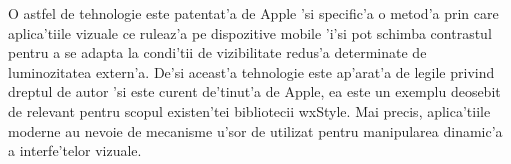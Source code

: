 \medskip

O astfel de tehnologie este patentat'a de Apple 'si specific'a o metod'a prin care aplica'tiile vizuale ce ruleaz'a pe dispozitive mobile 'i'si pot schimba contrastul pentru a se adapta la condi'tii de vizibilitate redus'a determinate de luminozitatea extern'a. De'si aceast'a tehnologie este ap'arat'a de legile privind dreptul de autor 'si este curent de'tinut'a de Apple, ea este un exemplu deosebit de relevant pentru scopul existen'tei bibliotecii wxStyle. Mai precis, aplica'tiile moderne au nevoie de mecanisme u'sor de utilizat pentru manipularea dinamic'a a interfe'telor vizuale.
